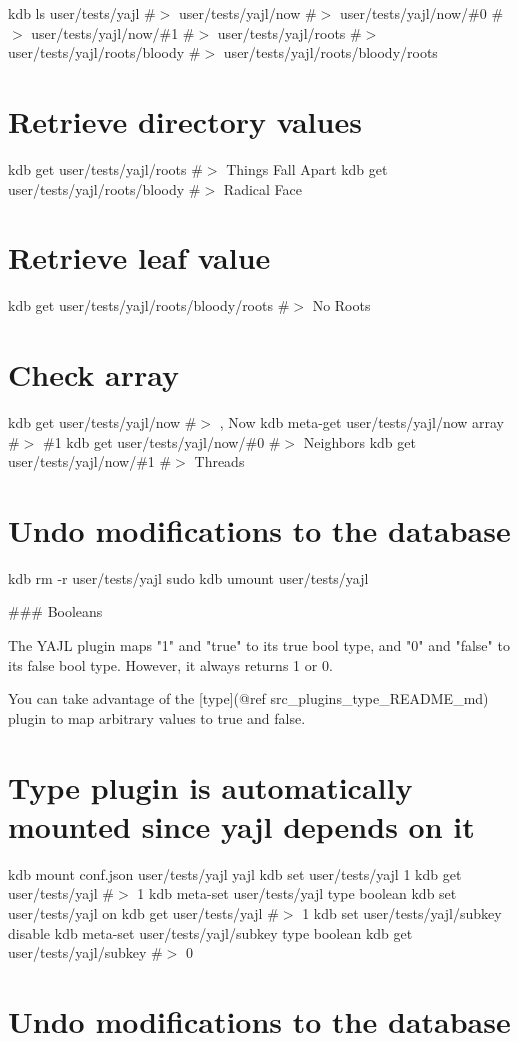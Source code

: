 kdb ls user/tests/yajl \#$>$ user/tests/yajl/now \#$>$ user/tests/yajl/now/\#0 \#$>$ user/tests/yajl/now/\#1 \#$>$ user/tests/yajl/roots \#$>$ user/tests/yajl/roots/bloody \#$>$ user/tests/yajl/roots/bloody/roots\hypertarget{autotoc_md835_autotoc_md859}{}\section{Retrieve directory values}\label{autotoc_md835_autotoc_md859}
kdb get user/tests/yajl/roots \#$>$ Things Fall Apart kdb get user/tests/yajl/roots/bloody \#$>$ Radical Face\hypertarget{autotoc_md835_autotoc_md860}{}\section{Retrieve leaf value}\label{autotoc_md835_autotoc_md860}
kdb get user/tests/yajl/roots/bloody/roots \#$>$ No Roots\hypertarget{autotoc_md835_autotoc_md861}{}\section{Check array}\label{autotoc_md835_autotoc_md861}
kdb get user/tests/yajl/now \#$>$ , Now kdb meta-\/get user/tests/yajl/now array \#$>$ \#1 kdb get user/tests/yajl/now/\#0 \#$>$ Neighbors kdb get user/tests/yajl/now/\#1 \#$>$ Threads\hypertarget{autotoc_md835_autotoc_md862}{}\section{Undo modifications to the database}\label{autotoc_md835_autotoc_md862}
kdb rm -\/r user/tests/yajl sudo kdb umount user/tests/yajl 
\begin{DoxyCode}
### Booleans

The YAJL plugin maps "1" and "true" to its true bool type, and "0" and "false" to its false bool type.
However, it always returns 1 or 0.

You can take advantage of the [type](@ref src\_plugins\_type\_README\_md) plugin to map arbitrary values to
       true and false.
\end{DoxyCode}
 \hypertarget{autotoc_md835_autotoc_md863}{}\section{Type plugin is automatically mounted since yajl depends on it}\label{autotoc_md835_autotoc_md863}
kdb mount conf.\+json user/tests/yajl yajl kdb set user/tests/yajl 1 kdb get user/tests/yajl \#$>$ 1 kdb meta-\/set user/tests/yajl type boolean kdb set user/tests/yajl on kdb get user/tests/yajl \#$>$ 1 kdb set user/tests/yajl/subkey disable kdb meta-\/set user/tests/yajl/subkey type boolean kdb get user/tests/yajl/subkey \#$>$ 0\hypertarget{autotoc_md835_autotoc_md864}{}\section{Undo modifications to the database}\label{autotoc_md835_autotoc_md864}
